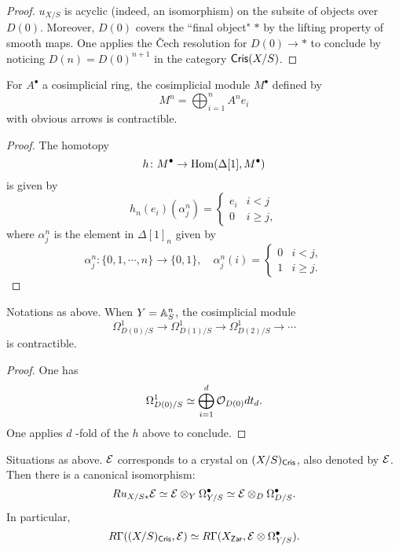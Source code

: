 \begin{proof}
    $u_{X/S}$ is acyclic (indeed, an isomorphism) 
    on the subsite of objects over $D(0)$. 
    Moreover, $D(0)$ covers the ``final object" $*$ 
    by the lifting property of smooth maps.
    One applies the \v Cech resolution for $D(0) \to *$ to conclude 
    by noticing $D(n) = D(0)^{n+1}$ in the category $\mathsf{Cris}(X/S)$. 
\end{proof}

\begin{lemma}
    For $A^\bullet$ a cosimplicial ring, 
    the cosimplicial module $M^\bullet$ defined by
    \[
        M^n = \bigoplus_{i = 1}^n A^n e_i
    \]
    with obvious arrows is contractible.
\end{lemma}

\begin{proof}
    The homotopy
    \[
        h \colon M^\bullet \to \operatorname{Hom}(\Delta[1], M^\bullet)
    \]
    is given by 
    \[
        h_n (e_i) (\alpha_j^n) = \left\{
            \begin{array}{rr}
                e_i & i<j \\
                0   & i \geq j,
            \end{array}
        \right.
    \]
    where $\alpha_j^n$ is the element in $\Delta[1]_n$ given by 
    \[
        \alpha_j^n \colon \{0,1,\cdots,n\} \to \{0,1\}, 
        \quad \alpha_j^n(i) = \left\{
            \begin{array}{rr}
                0 & i<j, \\
                1 & i \geq j.
            \end{array}
        \right.
    \]
\end{proof}

\begin{lemma}
    \label{Poincare ii}
    Notations as above. 
    When $Y = {\mathbb {A}}^n_S$, the cosimplicial module 
    \[
        \Omega_{D(0)/S}^1 \to \Omega_{D(1)/S}^1 
        \to \Omega_{D(2)/S}^1 \to \cdots
    \]
    is contractible.
\end{lemma}

\begin{proof}
    One has
    \[
        \Omega_{D(0)/S}^1 \simeq 
        \bigoplus_{i=1}^d {\mathcal {O}}_{D(0)} dt_d.
    \]
    One applies $d$ -fold of the $h$ above to conclude.
\end{proof}

\begin{theorem}
    Situations as above. 
    ${\mathcal {E}}$ corresponds to a crystal on $(X/S)_{\mathsf{Cris}}$, 
    also denoted by ${\mathcal {E}}$. 
    Then there is a canonical isomorphism:
    \[
        Ru_{X/S*} {\mathcal {E}} \simeq {\mathcal {E}} \otimes_Y \Omega_{Y/S}^\bullet 
        \simeq {\mathcal {E}} \otimes_D \Omega_{D/S}^\bullet.
    \]
    In particular,
    \[
        R \Gamma ((X/S)_{\mathsf{Cris}},{\mathcal {E}}) \simeq 
        R \Gamma (X_{\mathsf{Zar}}, {\mathcal {E}} \otimes \Omega_{Y/S}^\bullet). 
    \]
\end{theorem}

